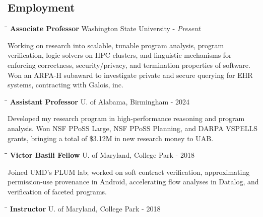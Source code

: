 \documentclass[line]{res}
\begin{document}
\begin{resume}
\section{\large Employment} 
   \vspace{-0.05in}   
   \begin{tabbing} 
    \hspace{2.25in}\= \hspace{2.25in}\= \kill 
    {\bf Associate Professor} \>Washington State University   - \textit{Present} 
   \end{tabbing}\vspace{-0.5cm}      
   Working on research into scalable, tunable program analysis, program verification, logic solvers on HPC clusters, and linguistic mechanisms for enforcing correctness, security/privacy, and termination properties of software. Won an ARPA-H subaward to investigate private and secure querying for EHR systems, contracting with Galois, inc. 
   \vspace{-0.2cm}   
   \begin{tabbing} 
    \hspace{2.25in}\= \hspace{2.25in}\= \kill 
    {\bf Assistant Professor} \>U. of Alabama, Birmingham   - 2024 
   \end{tabbing}\vspace{-0.5cm}      
   Developed my research program in high-performance reasoning and program analysis. Won NSF PPoSS Large, NSF PPoSS Planning, and DARPA VSPELLS grants, bringing a total of \$3.12M in new research money to UAB. 
   \vspace{-0.2cm}   
   \begin{tabbing} 
    \hspace{2.25in}\= \hspace{2.25in}\= \kill 
    {\bf Victor Basili Fellow} \>U. of Maryland, College Park   - 2018 
   \end{tabbing}\vspace{-0.5cm}      
   Joined UMD's PLUM lab; worked on soft contract verification, approximating permission-use provenance in Android, accelerating flow analyses in Datalog, and verification of faceted programs. 
   \vspace{-0.2cm}   
   \begin{tabbing} 
    \hspace{2.25in}\= \hspace{2.25in}\= \kill 
    {\bf Instructor} \>U. of Maryland, College Park   - 2018 
   \end{tabbing}\vspace{-0.5cm}      

\end{resume}
\end{document}
